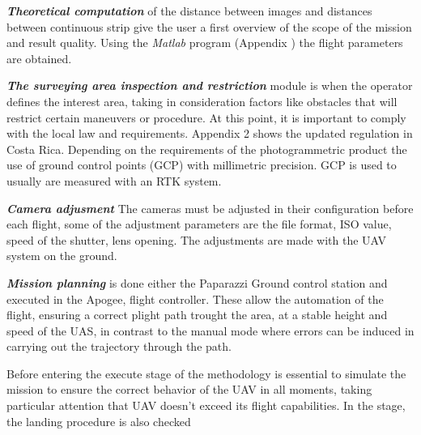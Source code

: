 \textit{\textbf{Theoretical computation}} of the distance between images and distances between continuous strip give the user a first overview of the scope of the mission and result quality. Using the \textit{Matlab} program (Appendix )  the flight parameters are obtained.

\textit{\textbf{The surveying area inspection and restriction}} module is when the operator defines the interest area, taking in consideration factors like obstacles that will restrict certain maneuvers or procedure. At this point, it is important to comply with the local law and requirements. Appendix 2 shows the updated regulation in Costa Rica. Depending on the requirements of the photogrammetric product the use of ground control points (GCP) with millimetric precision. GCP is used to usually are measured with an RTK system.

\textit{\textbf{Camera adjusment}}\newline
The cameras must be adjusted in their configuration before each flight, some of the adjustment parameters are the file format, ISO value, speed of the shutter, lens opening. The adjustments are made with the UAV system on the ground.

\textit{\textbf{Mission planning}} is done either the Paparazzi Ground control station and executed in the Apogee, flight controller. These allow the automation of the flight, ensuring a correct plight path trought the area, at a stable height and speed of the UAS, in contrast to the manual mode where errors can be induced in carrying out the trajectory through the path. 

Before entering the execute stage of the methodology is essential to simulate the mission to ensure the correct behavior of the UAV in all moments, taking particular attention that UAV doesn't exceed its flight capabilities. In the stage, the landing procedure is also checked
